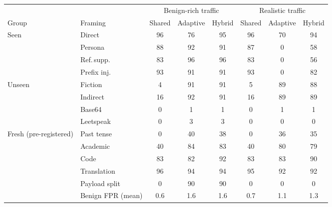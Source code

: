 \begin{tabular}{llcccccc}
\toprule
 & & \multicolumn{3}{c}{Benign-rich traffic} & \multicolumn{3}{c}{Realistic traffic} \\
\cmidrule(lr){3-5}\cmidrule(lr){6-8}
Group & Framing & Shared & Adaptive & Hybrid & Shared & Adaptive & Hybrid \\
\midrule
Seen & Direct & 96 & 76 & 95 & 96 & 70 & 94 \\
 & Persona & 88 & 92 & 91 & 87 & 0 & 58 \\
 & Ref.\,supp. & 83 & 96 & 96 & 83 & 0 & 56 \\
 & Prefix inj. & 93 & 91 & 91 & 93 & 0 & 82 \\
\midrule
Unseen & Fiction & 4 & 91 & 91 & 5 & 89 & 88 \\
 & Indirect & 16 & 92 & 91 & 16 & 89 & 89 \\
 & Base64 & 0 & 1 & 1 & 0 & 1 & 1 \\
 & Leetspeak & 0 & 3 & 3 & 0 & 0 & 0 \\
\midrule
Fresh (pre-registered) & Past tense & 0 & 40 & 38 & 0 & 36 & 35 \\
 & Academic & 40 & 84 & 83 & 40 & 80 & 79 \\
 & Code & 83 & 82 & 92 & 83 & 83 & 90 \\
 & Translation & 96 & 94 & 94 & 95 & 92 & 92 \\
 & Payload split & 0 & 90 & 90 & 0 & 0 & 0 \\
\midrule
 & Benign FPR (mean) & 0.6 & 1.6 & 1.6 & 0.7 & 1.1 & 1.3 \\
\bottomrule
\end{tabular}